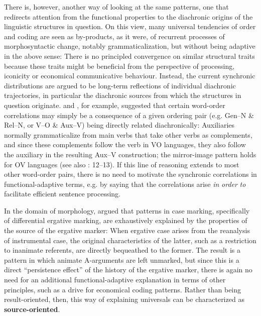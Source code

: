 \documentclass[output=paper]{langsci/langscibook}
\begin{document}
There is, however, another way of looking at the same patterns, one that redirects attention from the functional properties to the diachronic origins of the linguistic structures in question. On this view, many universal tendencies of order and coding are seen as by-products, as it were, of recurrent processes of morphosyntactic change, notably grammaticalization, but without being adaptive in the above sense: There is no principled convergence on similar structural traits because these traits might be beneficial from the perspective of processing, iconicity or economical communicative behaviour. Instead, the current synchronic distributions are argued to be long-term reflections of individual diachronic trajectories, in particular the diachronic sources from which the structures in question originate. \citet{Givón1984} and \citet{Aristar1991}, for example, suggested that certain word-order correlations may simply be a consequence of a given ordering pair (e.g. Gen–N \& Rel–N, or V–O \& Aux–V) being directly related diachronically: Auxiliaries normally grammaticalize from main verbs that take other verbs as complements, and since these complements follow the verb in VO languages, they also follow the auxiliary in the resulting Aux–V construction; the mirror-image pattern holds for OV languages (see also \citealt{Lehmann1986}: 12–13). If this line of reasoning extends to most other word-order pairs, there is no need to motivate the synchronic correlations in functional-adaptive terms, e.g. by saying that the correlations arise \textit{in} \textit{order} \textit{to} facilitate efficient sentence processing. 

In the domain of morphology, \citet{Garrett1990} argued that patterns in case marking, specifically of differential ergative marking, are exhaustively explained by the properties of the source of the ergative marker: When ergative case arises from the reanalysis of instrumental case, the original characteristics of the latter, such as a restriction to inanimate referents, are directly bequeathed to the former. The result is a pattern in which animate A-arguments are left unmarked, but since this is a direct “persistence effect” \citep{Hopper1991} of the history of the ergative marker, there is again no need for an additional functional-adaptive explanation in terms of other principles, such as a drive for economical coding patterns. Rather than being result-oriented, then, this way of explaining universals can be characterized as \textbf{source-oriented}.
\end{document}
